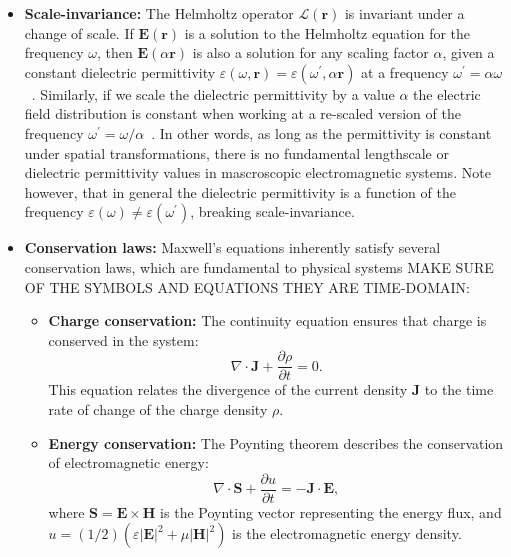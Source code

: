 \begin{itemize}
    \item \textbf{Scale-invariance:} The Helmholtz operator $\mathcal{L}(\mathbf{r})$ is invariant under a change of scale. 
    If $\mathbf{E}(\mathbf{r})$ is a solution to the Helmholtz equation for the frequency $\omega$, then $\mathbf{E}(\alpha \mathbf{r})$ 
    is also a solution for any scaling factor $\alpha$, given a constant
     dielectric permittivity $\varepsilon(\omega, \mathbf{r}) = \varepsilon (\omega^\prime, \alpha \mathbf{r})$ at a frequency $\omega^\prime = \alpha \omega$~\cite{phot_crys}. Similarly,
     if we scale the dielectric permittivity by a value $\alpha$ the electric field distribution is constant when working at a re-scaled version of the 
     frequency $\omega^\prime=\omega/\alpha $~\cite{phot_crys}.
    In other words, as long as the permittivity is constant under spatial transformations, there is no fundamental lengthscale or dielectric permittivity  
    values in mascroscopic electromagnetic systems. Note however, that in general the dielectric permittivity is a function of the frequency $\varepsilon(\omega)\neq \varepsilon(\omega^\prime)$, 
    breaking scale-invariance.
    
    \item \textbf{Conservation laws:} Maxwell's equations inherently satisfy several conservation laws, which are fundamental to physical systems MAKE SURE OF THE SYMBOLS AND EQUATIONS THEY ARE TIME-DOMAIN:
    \begin{itemize}
        \item \textbf{Charge conservation:} The continuity equation ensures that charge is conserved in the system:
        \begin{equation}
            \nabla \cdot \mathbf{J} + \frac{\partial \rho}{\partial t} = 0.
        \end{equation}
        This equation relates the divergence of the current density $\mathbf{J}$ to the time rate of change of the charge density $\rho$.

        \item \textbf{Energy conservation:} The Poynting theorem describes the conservation of electromagnetic energy:
        \begin{equation}
            \nabla \cdot \mathbf{S} + \frac{\partial u}{\partial t} = -\mathbf{J} \cdot \mathbf{E},
        \end{equation}
        where $\mathbf{S} = \mathbf{E} \times \mathbf{H}$ is the Poynting vector representing the energy flux, and $u = (1/2) (\varepsilon |\mathbf{E}|^2 + \mu |\mathbf{H}|^2)$ is the electromagnetic energy density.


\end{itemize}
\end{itemize}

